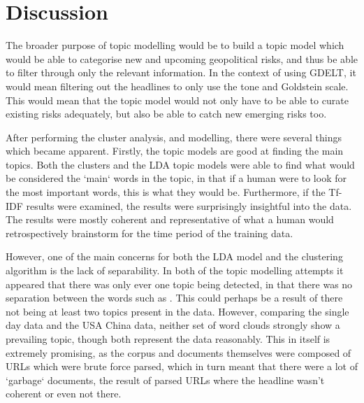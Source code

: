 \section{Discussion}
The broader purpose of topic modelling would be to build a topic model which would be able to categorise new and upcoming geopolitical risks, and thus be able to filter through only the relevant information. In the context of using GDELT, it would mean filtering out the headlines to only use the tone and Goldstein scale. This would mean that the topic model would not only have to be able to curate existing risks adequately, but also be able to catch new emerging risks too.

After performing the cluster analysis, and modelling, there were several things which became apparent. Firstly, the topic models are good at finding the main topics. Both the clusters and the LDA topic models were able to find what would be considered the `main` words in the topic, in that if a human were to look for the most important words, this is what they would be. Furthermore, if the Tf-IDF results were examined, the results were surprisingly insightful into the data. The results were mostly coherent and representative of what a human would retrospectively brainstorm for the time period of the training data.

However, one of the main concerns for both the LDA model and the clustering algorithm is the lack of separability. In both of the topic modelling attempts it appeared that there was only ever one topic being detected, in that there was no separation between the words such as . This could perhaps be a result of there not being at least two topics present in the data. However, comparing the single day data and the USA China data, neither set of word clouds strongly show a prevailing topic, though both represent the data reasonably. This in itself is extremely promising, as the corpus and documents themselves were composed of URLs which were brute force parsed, which in turn meant that there were a lot of `garbage` documents, the result of parsed URLs where the headline wasn't coherent or even not there.

